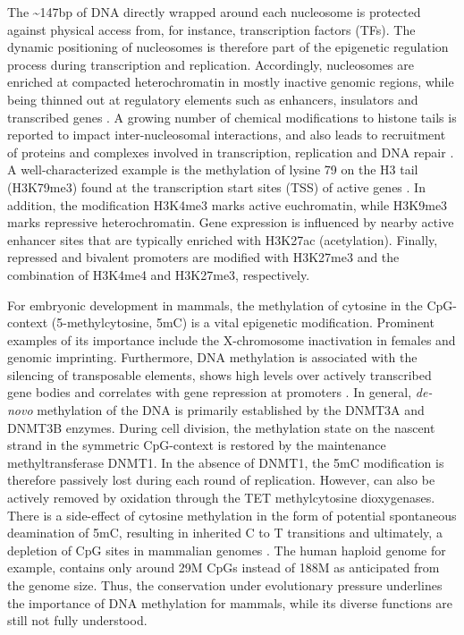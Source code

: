 The \textasciitilde 147bp of DNA directly wrapped around each nucleosome is protected against physical access from, for instance, transcription factors (TFs). 
The dynamic positioning of nucleosomes is therefore part of the epigenetic regulation process during transcription and replication.
Accordingly, nucleosomes are enriched at compacted heterochromatin in mostly inactive genomic regions, while being thinned out at regulatory elements such as enhancers, insulators and transcribed genes \cite{Klemm2019}. 
A growing number of chemical modifications to histone tails is reported to impact inter-nucleosomal interactions, and also leads to recruitment of proteins and complexes involved in transcription, replication and DNA repair \cite{Bannister2011}. 
A well-characterized example is the methylation of lysine 79 on the H3 tail (H3K79me3) found at the transcription start sites (TSS) of active genes \cite{Lawrence2016}. 
In addition, the modification H3K4me3 marks active euchromatin, while H3K9me3 marks repressive heterochromatin.
Gene expression is influenced by nearby active enhancer sites that are typically enriched with H3K27ac (acetylation).
Finally, repressed and bivalent promoters are modified with H3K27me3 and the combination of H3K4me4 and H3K27me3, respectively.

For embryonic development in mammals, the methylation of cytosine in the CpG-context (5-methylcytosine, 5mC) is a vital epigenetic modification. Prominent examples of its importance include the X-chromosome inactivation in females and genomic imprinting.
Furthermore, DNA methylation is associated with the silencing of transposable elements, shows high levels over actively transcribed gene bodies and correlates with gene repression at promoters \cite{Greenberg2019}.
In general, \textit{de-novo} methylation of the DNA is primarily established by the DNMT3A and DNMT3B enzymes. 
During cell division, the methylation state on the nascent strand in the symmetric CpG-context is restored by the maintenance methyltransferase DNMT1.
In the absence of DNMT1, the 5mC modification is therefore passively lost during each round of replication. 
However, can also be actively removed by oxidation through the TET methylcytosine dioxygenases.
There is a side-effect of cytosine methylation in the form of potential spontaneous deamination of 5mC, resulting in inherited C to T transitions and ultimately, a depletion of CpG sites in mammalian genomes \cite{Holliday1993}. 
The human haploid genome for example, contains only around 29M CpGs instead of 188M as anticipated from the genome size. 
Thus, the conservation under evolutionary pressure underlines the importance of DNA methylation for mammals, while its diverse functions are still not fully understood.


